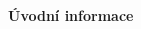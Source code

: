 %
{}
\begin{adjustwidth}{0.1\textwidth}{0.1\textwidth}
\begin{center}
{\bfseries\Large Úvodní informace}\par\vspace{2em}


\end{center}
\endgroup
\end{adjustwidth}
